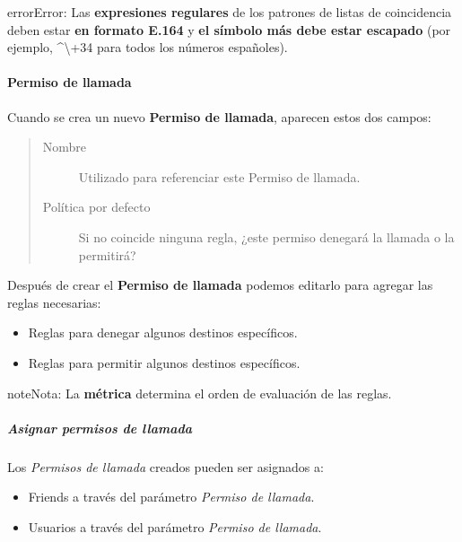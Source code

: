 \documentclass[letterpaper,10pt,spanish]{sphinxmanual}
\begin{document}
\begin{notice}{error}{Error:}
Las \textbf{expresiones regulares} de los patrones de listas de coincidencia deben estar \textbf{en formato E.164} y \textbf{el símbolo más debe estar escapado} (por ejemplo, \textasciicircum{}\textbackslash{}+34 para todos los números españoles).
\end{notice}


\paragraph{Permiso de llamada}
\label{administration_portal/client/vpbx/user_configuration/call_acls:call-acl}
Cuando se crea un nuevo \textbf{Permiso de llamada}, aparecen estos dos campos:
\begin{quote}
\begin{description}
\item[{Nombre}] \leavevmode
Utilizado para referenciar este Permiso de llamada.

\item[{Política por defecto}] \leavevmode
Si no coincide ninguna regla, ¿este permiso denegará la llamada o la permitirá?

\end{description}
\end{quote}

Después de crear el \textbf{Permiso de llamada} podemos editarlo para agregar las reglas necesarias:
\begin{itemize}
\item {} 
Reglas para denegar algunos destinos específicos.

\item {} 
Reglas para permitir algunos destinos específicos.

\end{itemize}

\begin{notice}{note}{Nota:}
La \textbf{métrica} determina el orden de evaluación de las reglas.
\end{notice}


\subparagraph{Asignar permisos de llamada}
\label{administration_portal/client/vpbx/user_configuration/call_acls:assign-call-acls}
Los \emph{Permisos de llamada} creados pueden ser asignados a:
\begin{itemize}
\item {} 
Friends a través del parámetro \emph{Permiso de llamada}.

\item {} 
Usuarios a través del parámetro \emph{Permiso de llamada}.

\end{itemize}
\end{document}
